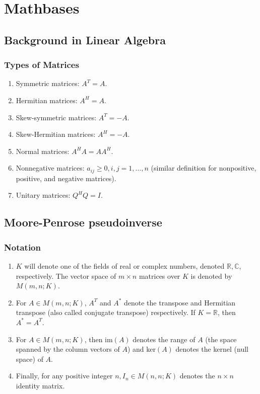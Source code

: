 \chapter{Mathbases}
\label{mathbase}
\section{Background in Linear Algebra}
\subsection{Types of Matrices}
\begin{enumerate}
    \item Symmetric matrices: $A^T = A$.
    \item Hermitian matrices: $A^H = A$.
    \item Skew-symmetric matrices: $A^T = -A$.
    \item Skew-Hermitian matrices: $A^H = -A$.
    \item Normal matrices: $A^H A = A A^H$.
    \item Nonnegative matrices: $a_{ij}\geq 0, i,j=1,\dots,n$ (similar definition for nonpositive, positive, and negative matrices).
    \item Unitary matrices: $Q^H Q = I$.
\end{enumerate}

\section{Moore-Penrose pseudoinverse}
\label{moore-penrose}
\subsection{Notation}
\begin{enumerate}[$\bullet$]
    \item $K$ will denote one of the fields of real or complex numbers, denoted $\mathbb{R},\mathbb{C}$, respectively. The vector space of $m\times n$ matrices over $K$ is denoted by $M(m,n;K)$.
    \item For $A \in M(m,n;K)$, $A^T$ and $A^*$ denote the transpose and Hermitian transpose (also called conjugate transpose) respectively. If $K = \mathbb{R}$, then $A^* = A^T$.
    \item For $A \in M(m,n;K)$, then im$(A)$ denotes the range of $A$ (the space spanned by the column vectors of $A$) and ker$(A)$ \textcolor[rgb]{1,0,0}{denotes the kernel (null space)} of $A$.
    \item Finally, for any positive integer $n, I_n \in M(n,n;K)$ denotes the $n \times n$ identity matrix.
\end{enumerate}

